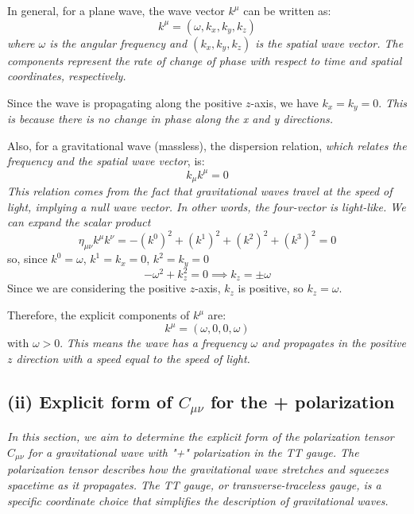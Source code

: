 \documentclass{article}
\begin{document}
In general, for a plane wave, the wave vector $k^{\mu}$ can be written as:
\begin{equation}
k^{\mu} = (\omega, k_x, k_y, k_z)
\end{equation}
\emph{where $\omega$ is the angular frequency and $(k_x, k_y, k_z)$ is the spatial wave vector. The components represent the rate of change of phase with respect to time and spatial coordinates, respectively.}

Since the wave is propagating along the positive $z$-axis, we have $k_x = k_y = 0$. \emph{This is because there is no change in phase along the x and y directions.}

Also, for a gravitational wave (massless), the dispersion relation, \emph{which relates the frequency and the spatial wave vector}, is:
\begin{equation}
k_{\mu}k^{\mu}=0
\end{equation}
\emph{This relation comes from the fact that gravitational waves travel at the speed of light, implying a null wave vector. In other words, the four-vector is light-like. We can expand the scalar product}
\begin{equation}
\eta_{\mu\nu}k^{\mu}k^{\nu}= -\left(k^{0}\right)^{2}+\left(k^{1}\right)^{2}+\left(k^{2}\right)^{2}+\left(k^{3}\right)^{2}=0
\end{equation}
so, since $k^{0}=\omega$, $k^{1}=k_{x}=0$, $k^{2}=k_{y}=0$
\begin{equation}
-\omega^{2}+k_{z}^{2}=0 \implies k_{z}=\pm \omega
\end{equation}
Since we are considering the positive $z$-axis, $k_z$ is positive, so $k_z = \omega$.

Therefore, the explicit components of $k^{\mu}$ are:
\begin{equation}
k^{\mu} = (\omega, 0, 0, \omega)
\end{equation}
with $\omega > 0$. \emph{This means the wave has a frequency $\omega$ and propagates in the positive $z$ direction with a speed equal to the speed of light.}

\subsection*{(ii) Explicit form of $C_{\mu \nu}$ for the + polarization}

\emph{In this section, we aim to determine the explicit form of the polarization tensor $C_{\mu \nu}$ for a gravitational wave with "+" polarization in the TT gauge. The polarization tensor describes how the gravitational wave stretches and squeezes spacetime as it propagates. The TT gauge, or transverse-traceless gauge, is a specific coordinate choice that simplifies the description of gravitational waves.}
\end{document}

